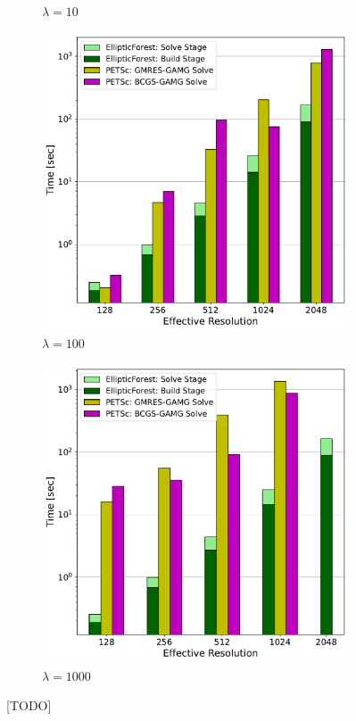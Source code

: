 \begin{figure}
\begin{subfigure}[t]{0.48\textwidth}
        \caption{$\lambda = 10$}
    \end{subfigure}
    \begin{subfigure}[t]{0.48\textwidth}
        \includegraphics[width=1\textwidth, clip=true, trim={0 0 0 0}]{figures/case03-l100-stacked-bar-plot-comparisons-no-title.pdf}
        \caption{$\lambda = 100$}
    \end{subfigure}
    \begin{subfigure}[t]{0.48\textwidth}
        \includegraphics[width=1\textwidth, clip=true, trim={0 0 0 0}]{figures/case03-l1000-stacked-bar-plot-comparisons-no-title.pdf}
        \caption{$\lambda = 1000$}
    \end{subfigure}
    \caption{[TODO]}
    \label{fig:case03-stacked-bar-plot}
\end{figure}


